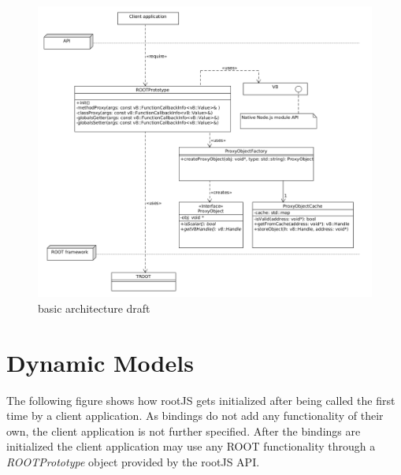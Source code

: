 \begin{figure}[htb]
	\centering
	\includegraphics[width=18cm]{./latex/resources/architecture.png}
	\caption{basic architecture draft}
\end{figure}
\pagebreak

\section{Dynamic Models}
The following figure shows how rootJS gets initialized after being called the first time by a client application. As bindings do not add any functionality of their own, the client application is not further specified. After the bindings are initialized the client application may use any ROOT functionality through a \textit{ROOTPrototype} object provided by the rootJS API.

